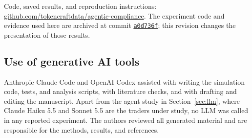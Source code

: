 \documentclass{article}
\begin{document}
Code, saved results, and reproduction instructions: \href{https://github.com/tokencraftdata/agentic-compliance}{github.com/tokencraftdata/agentic-compliance}. The experiment code and evidence used here are archived at commit \href{https://github.com/tokencraftdata/agentic-compliance/tree/a0d736fc6b6452e0d5ccd1d12a54e29e4c087ea9}{\texttt{a0d736f}}; this revision changes the presentation of those results.

\subsection{Use of generative AI tools}

Anthropic Claude Code and OpenAI Codex assisted with writing the simulation code, tests, and analysis scripts, with literature checks, and with drafting and editing the manuscript. Apart from the agent study in Section~\ref{sec:llm}, where Claude Haiku 5.5 and Sonnet 5.5 are the traders under study, no LLM was called in any reported experiment. The authors reviewed all generated material and are responsible for the methods, results, and references.

\small
\end{document}
